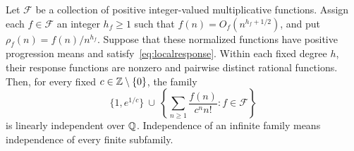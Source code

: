 \begin{theorem}
\label{thm:transfer}
Let $\mathcal F$ be a collection of positive integer-valued
multiplicative functions. Assign each $f\in\mathcal F$ an integer
$h_f\geq1$ such that $f(n)=O_f(n^{h_f+1/2})$, and put
$\rho_f(n)=f(n)/n^{h_f}$. Suppose that these normalized functions
have positive progression means and satisfy~\eqref{eq:localresponse}.
Within each fixed degree $h$, their response functions are nonzero
and pairwise distinct rational functions.
Then, for every fixed $c\in\mathbb Z\setminus\{0\}$, the family
\begin{equation}\label{eq:transferfamily}
 \{1,e^{1/c}\}\ \cup\
 \left\{\sum_{n\geq1}\frac{f(n)}{c^n n!}:f\in\mathcal F\right\}
\end{equation}
is linearly independent over $\mathbb Q$. Independence of an infinite family
means independence of every finite subfamily.
\end{theorem}
